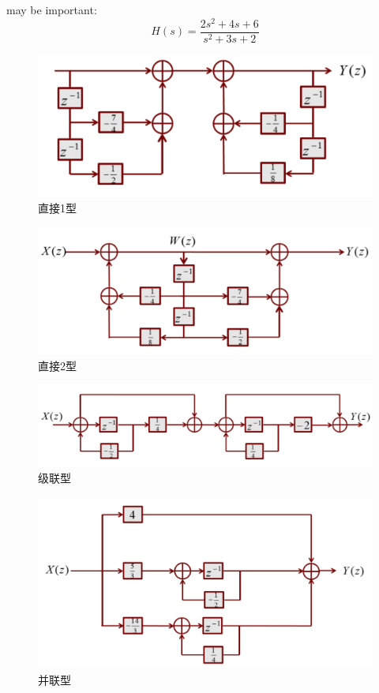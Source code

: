 \documentclass{article}
\begin{document}
\begin{defi}[方框图]may be important:
	\[
		H(s)=\frac{2s^2+4s+6}{s^2+3s+2}
	\]
	\begin{figure}[H]
		\centering
		\includegraphics[width=0.7\linewidth]{z直接1.png}
		\caption{直接1型}
	\end{figure}
	\begin{figure}[H]
		\centering
		\includegraphics[width=0.7\linewidth]{z直接2.png}
		\caption{直接2型}
	\end{figure}
	\begin{figure}[H]
		\centering
		\includegraphics[width=0.7\linewidth]{z级联.png}
		\caption{级联型}
	\end{figure}
	\begin{figure}[H]
		\centering
		\includegraphics[width=0.7\linewidth]{z并联.png}
		\caption{并联型}
	\end{figure}
\end{defi}
\end{document}
